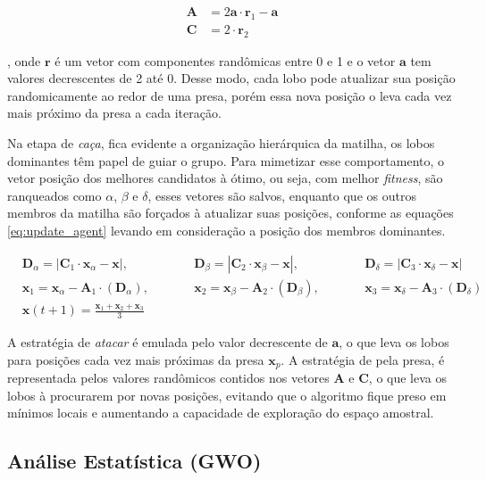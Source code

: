 \documentclass[a4paper, 11pt]{article}
\begin{document}
\begin{align}
\mathbf{A}&=2 \mathbf{a} \cdot \mathbf{r}_1-\mathbf{a} \\
\mathbf{C}&=2 \cdot \mathbf{r}_2
\end{align}

, onde \( \mathbf{r} \) é um vetor com componentes randômicas entre 0 e 1 e o vetor \( \mathbf{a} \) tem valores decrescentes de 2 até 0. Desse modo, cada lobo pode atualizar sua posição randomicamente ao redor de uma presa, porém essa nova posição o leva cada vez mais próximo da presa a cada iteração. 

Na etapa de \textit{caça}, fica evidente a organização hierárquica da matilha, os lobos dominantes têm papel de guiar o grupo. Para mimetizar esse comportamento, o vetor posição dos melhores candidatos à ótimo, ou seja, com melhor \textit{fitness}, são ranqueados como \(\alpha \), \( \beta\) e \( \delta \), esses vetores são salvos, enquanto que os outros membros da matilha são forçados à atualizar suas posições, conforme as equações \ref{eq:update_agent} levando em consideração a posição dos membros dominantes.

\begin{align}
\label{eq:update_agent}
&\mathbf{D}_\alpha=\left|\mathbf{C}_1 \cdot \mathbf{x}_\alpha-\mathbf{x}\right|,& \qquad & \mathbf{D}_\beta=\left|\mathbf{C}_2 \cdot \mathbf{x}_\beta-\mathbf{x}\right|,& \qquad &\mathbf{D}_\delta=\left|\mathbf{C}_3 \cdot \mathbf{x}_\delta-\mathbf{x}\right| \\
&\mathbf{x}_1=\mathbf{x}_\alpha-\mathbf{A}_1 \cdot\left(\mathbf{D}_\alpha\right),& \qquad & \mathbf{x}_2=\mathbf{x}_\beta-\mathbf{A}_2 \cdot\left(\mathbf{D}_\beta\right),& \qquad & \mathbf{x}_3=\mathbf{x}_\delta-\mathbf{A}_3 \cdot\left(\mathbf{D}_\delta\right) \\
&\mathbf{x}(t+1)=\frac{\mathbf{x}_1+\mathbf{x}_2+\mathbf{x}_3}{3} & \qquad & \qquad &
\end{align}

A estratégia de \textit{atacar} é emulada pelo valor decrescente de \( \mathbf{a} \), o que leva os lobos para posições cada vez mais próximas da presa \( \mathbf{x}_p \). A estratégia de  pela presa, é representada pelos valores randômicos contidos nos vetores \( \mathbf{A}\) e \(\mathbf{C}\), o que leva os lobos à procurarem por novas posições, evitando que o algoritmo fique preso em mínimos locais e aumentando a capacidade de exploração do espaço amostral.

\subsection{Análise Estatística (GWO)}
\end{document}
